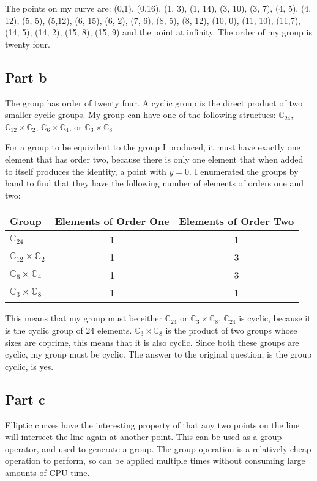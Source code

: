 \documentclass[11pt,a4paper,twoside]{article}
\begin{document}
The points on my curve are: (0,1), (0,16), (1, 3), (1, 14), (3, 10), (3, 7),
(4, 5), (4, 12), (5, 5), (5,12), (6, 15), (6, 2), (7, 6), (8, 5), (8, 12), (10,
0), (11, 10), (11,7), (14, 5), (14, 2), (15, 8), (15, 9) and the point at
infinity. The order of my group is twenty four. 

\subsection{Part b}
The group has order of twenty four. A cyclic group is the direct product of two
smaller cyclic groups. My group can have one of the following structues:
$\mathbb{C}_{24}$, $\mathbb{C}_{12}\times\mathbb{C}_{2}$,
$\mathbb{C}_{6}\times\mathbb{C}_{4}$, or $\mathbb{C}_{3}\times\mathbb{C}_{8}$

For a group to be equivilent to the group I produced, it must have exactly one
element that has order two, because there is only one element that when added
to itself produces the identity, a point with $y = 0$. I enumerated the groups
by hand to find that they have the following number of elements of orders one
and two: 

\begin{table}[H]
\centering
\begin{tabular}{l@{}cc}
Group                                 & Elements of Order One & Elements of Order Two \\  \midrule
$\mathbb{C}_{24}$                     & 1                     & 1                     \\
$\mathbb{C}_{12}\times\mathbb{C}_{2}$ & 1                     & 3                     \\
$\mathbb{C}_{6}\times\mathbb{C}_{4}$  & 1                     & 3                     \\
$\mathbb{C}_{3}\times\mathbb{C}_{8}$  & 1                     & 1                     
\end{tabular}
\end{table}

This means that my group must be either $\mathbb{C}_{24}$ or
$\mathbb{C}_{3}\times\mathbb{C}_{8}$. $\mathbb{C}_{24}$ is cyclic, because it
is the cyclic group of 24 elements. $\mathbb{C}_{3}\times\mathbb{C}_{8}$ is the
product of two groups whose sizes are coprime, this means that it is also
cyclic. Since both these groups are cyclic, my group must be cyclic. The answer
to the original question, is the group cyclic, is yes. 

\subsection{Part c}
Elliptic curves have the interesting property of that any two points on the
line will intersect the line again at another point. This can be used as a
group operator, and used to generate a group. The group operation is a
relatively cheap operation to perform, so can be applied multiple times without
consuming large amounts of CPU time. 
\end{document}
